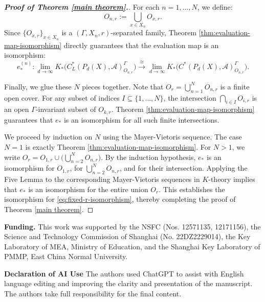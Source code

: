 \documentclass[pdflatex]{sn-jnl}
\theoremstyle{plain}
\theoremstyle{definition}
\begin{document}
\begin{proof}[\textbf{Proof of Theorem \ref{main theorem}.}]
For each $n=1,\dots, N$, we define:
\[O_{n,r}:=\bigcup_{x\in X_n}O_{x,r}.\]
Since $\{O_{x,r}\}_{x\in X_n}$ is a $(\Gamma,X_n,r)$-separated family, Theorem \ref{thm:evaluation-map-isomorphism} directly guarantees that the evaluation map is an isomorphism:
\[e_{*}^{(n)}:\lim_{d\to\infty}K_{*}\bigl(C_L^{*}(P_{d}(X),\mathcal{A})^\Gamma_{O_{n,r}}\bigr) 
\xrightarrow{\cong}\lim_{d\to\infty }K_{*}\bigl(C^{*}(P_{d}(X),\mathcal{A})^\Gamma_{O_{n,r}}\bigr).
\]

Finally, we glue these $N$ pieces together. Note that $O_{r}=\bigcup_{n=1}^{N}O_{n,r}$ is a finite open cover. For any subset of indices $I\subseteq\{1,\dots,N\}$, the intersection $\bigcap_{i\in I}O_{i,r}$ is an open $\Gamma$-invariant subset of $O_{k,r}$. Theorem \ref{thm:evaluation-map-isomorphism} guarantees that $e_{*}$ is an isomorphism for all such finite intersections. 

We proceed by induction on $N$ using the Mayer-Vietoris sequence. The case $N=1$ is exactly Theorem \ref{thm:evaluation-map-isomorphism}. For $N>1$, we write $O_r= O_{1,r}\cup\bigl(\bigcup_{n=2}^{N}O_{n,r}\bigr)$. By the induction hypothesis, $e_{*}$ is an isomorphism for $O_{1,r}$, for $\bigcup_{n=2}^{N}O_{n,r}$, and for their intersection. Applying the Five Lemma to the corresponding Mayer-Vietoris sequences in $K$-theory implies that $e_{*}$ is an isomorphism for the entire union $O_r$. 
This establishes the isomorphism for \ref{eq:fixed-r-isomorphism}, thereby completing the proof of Theorem \ref{main theorem}.
\end{proof}

\noindent\textbf{Funding.}
This work was supported by the NSFC (Nos. 12571135, 12171156), the
Science and Technology Commission of Shanghai (No. 22DZ2229014), the Key
Laboratory of MEA, Ministry of Education, and the Shanghai Key Laboratory of PMMP,
East China Normal University.
\vspace{\baselineskip}

\noindent\textbf{Declaration of AI Use}
The authors used ChatGPT to assist with English language editing and improving the clarity and presentation of the manuscript. The authors take full responsibility for the final content.




\printendmatterinfo
\end{document}

